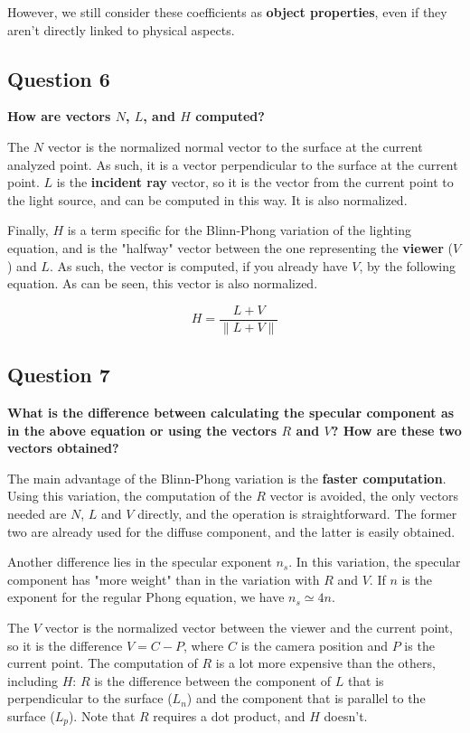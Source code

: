 \documentclass[12pt]{article}
\begin{document}
However, we still consider these coefficients as \textbf{object properties}, even if they aren't directly linked to physical aspects.

\subsection*{Question 6}
{\bfseries How are vectors $N$, $L$, and $H$ computed?}

The $N$ vector is the normalized normal vector to the surface at the current analyzed point. As such, it is a vector perpendicular to the surface at the current point. $L$ is the \textbf{incident ray} vector, so it is the vector from the current point to the light source, and can be computed in this way. It is also normalized.

Finally, $H$ is a term specific for the Blinn-Phong variation of the lighting equation, and is the "halfway" vector between the one representing the \textbf{viewer} ($V$) and $L$. As such, the vector is computed, if you already have $V$, by the following equation. As can be seen, this vector is also normalized.

\[H=\frac{L+V}{\lVert L+V \lVert}\]

\subsection*{Question 7}
{\bfseries What is the difference between calculating the specular component as in the above equation or using the vectors $R$ and $V$? How are these two vectors obtained?}

The main advantage of the Blinn-Phong variation is the \textbf{faster computation}. Using this variation, the computation of the $R$ vector is avoided, the only vectors needed are $N$, $L$ and $V$ directly, and the operation is straightforward. The former two are already used for the diffuse component, and the latter is easily obtained. 

Another difference lies in the specular exponent $n_s$. In this variation, the specular component has "more weight" than in the variation with $R$ and $V$. If $n$ is the exponent for the regular Phong equation, we have $n_s \simeq 4n$.

The $V$ vector is the normalized vector between the viewer and the current point, so it is the difference $V=C-P$, where $C$ is the camera position and $P$ is the current point. The computation of $R$ is a lot more expensive than the others, including $H$: $R$ is the difference between the component of $L$ that is perpendicular to the surface ($L_n$) and the component that is parallel to the surface ($L_p$). Note that $R$ requires a dot product, and $H$ doesn't.
\end{document}
